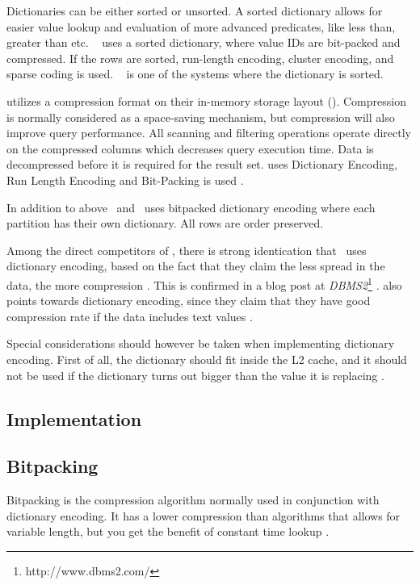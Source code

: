Dictionaries can be either sorted or unsorted. A sorted dictionary allows for easier value lookup and evaluation of more advanced predicates, like less than, greater than etc. \saph~\cite{Farber2012-vh} uses a sorted dictionary, where value IDs are bit-packed and compressed. If the rows are sorted, run-length encoding, cluster encoding, and sparse coding is used. \sapnw~\cite{Lemke2010-is} is one of the systems where the dictionary is sorted.

\oracle utilizes a compression format on their in-memory storage layout (\cite{Oracle2015-fs}). Compression is normally considered as a space-saving mechanism, but compression will also improve query performance. All scanning and filtering operations operate directly on the compressed columns which decreases query execution time. Data is decompressed before it is required for the result set. \oracle uses Dictionary Encoding, Run Length Encoding and Bit-Packing is used \cite{Oracle2015-fs}. 

In addition to above \ibm~and \blink~uses bitpacked dictionary encoding where each partition has their own dictionary. All rows are order preserved.

Among the direct competitors of \genusSoftware, there is strong identication that \qlikview~uses dictionary encoding, based on the fact that they claim the less spread in the data, the more compression \cite{Qlik2011-ef}. This is confirmed in a blog post at \textit{DBMS2}\footnote{http://www.dbms2.com/} \cite{noauthor_undated-js}. \tableau also points towards dictionary encoding, since they claim that they have good compression rate if the data includes text values \cite{Kamkolkar2015-iq}.

Special considerations should however be taken when implementing dictionary encoding. First of all, the dictionary should fit inside the L2 cache, and it should not be used if the dictionary turns out bigger than the value it is replacing \cite{Holloway2008-rr}. 

\subsection{Implementation}
\label{sub:Implementation}


\subsection{Bitpacking}
\label{sub:Bitpacking}
Bitpacking is the compression algorithm normally used in conjunction with dictionary encoding. It has a lower compression than algorithms that allows for variable length, but you get the benefit of constant time lookup \cite{Raman2008-gi}.

